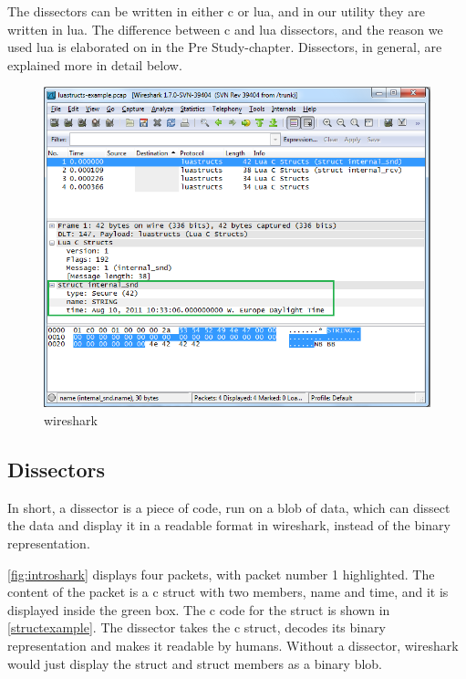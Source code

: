 The \glspl{dissector} can be written in either \Gls{c} or \Gls{lua}, and in our \gls{utility} they are written in \Gls{lua}.
The difference between \Gls{c} and \Gls{lua} \glspl{dissector}, and the reason we used \Gls{lua} is elaborated on in the Pre Study-chapter.
Dissectors, in general, are explained more in detail below.

\begin{figure}[ht]
	\includegraphics[width=\textwidth]{./img/wireshark_example.png}
	\caption{\Gls{wireshark}\label{fig:introshark}}
\end{figure}

\subsection{Dissectors}
In short, a \gls{dissector} is a piece of code, run on a blob of data, which can dissect the
data and display it in a readable format in \Gls{wireshark}, instead of the \gls{binary} representation.

\autoref{fig:introshark} displays four \glspl{packet}, with \gls{packet} number 1 highlighted.
The content of the \gls{packet} is a \Gls{c} \gls{struct} with two \glspl{member}, name and time, and it is displayed inside the green box.
The \Gls{c} code for the \gls{struct} is shown in \autoref{structexample}.
The \gls{dissector} takes the \Gls{c} \gls{struct}, decodes its \gls{binary} representation and makes it readable by humans.
Without a \gls{dissector}, \Gls{wireshark} would just display the \gls{struct} and \gls{struct} \glspl{member} as a \gls{binary} blob.

